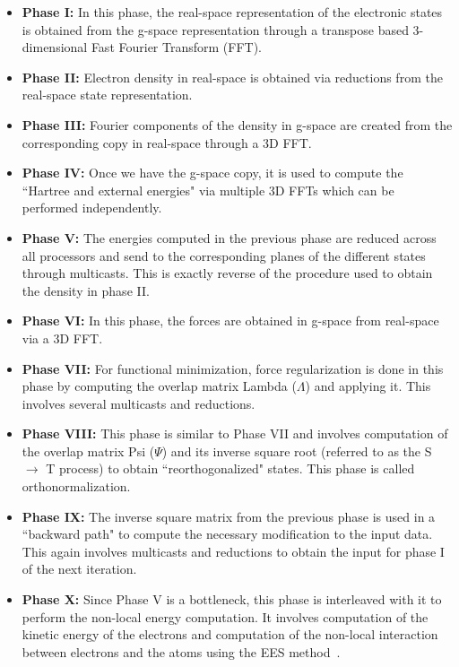 \documentclass[12pt,letter]{article}
\begin{document}
\begin{itemize}
\item{\bf Phase I:} In this phase, the real-space representation of the 
electronic states is obtained from the g-space representation through a 
transpose based 3-dimensional Fast Fourier Transform (FFT). 

\item{\bf Phase II:} Electron density in real-space is obtained via reductions
from the real-space state representation.

\item{\bf Phase III:} Fourier components of the density in g-space are created
from the corresponding copy in real-space through a 3D FFT.

\item{\bf Phase IV:} Once we have the g-space copy, it is used to compute the
``Hartree and external energies" via multiple 3D FFTs which can be performed
independently.

\item{\bf Phase V:} The energies computed in the previous phase are reduced
across all processors and send to the corresponding planes of the different 
states through multicasts. This is exactly reverse of the procedure used to 
obtain the density in phase II.

\item{\bf Phase VI:} In this phase, the forces are obtained in g-space from
real-space via a 3D FFT.

\item{\bf Phase VII:} For functional minimization, force regularization is done
in this phase by computing the overlap matrix Lambda ($\Lambda$) and applying 
it. This involves several multicasts and reductions.

\item{\bf Phase VIII:} This phase is similar to Phase VII and involves
computation of the overlap matrix Psi ($\Psi$) and its inverse square root 
(referred to as the S $\rightarrow$ T process) to obtain ``reorthogonalized" 
states. This phase is called orthonormalization.

\item{\bf Phase IX:} The inverse square matrix from the previous phase is
used in a ``backward path" to compute the necessary modification to the
input data. This again involves multicasts and reductions to obtain the input
for phase I of the next iteration.

\item{\bf Phase X:} Since Phase V is a bottleneck, this phase is interleaved 
with it to perform the non-local energy computation. It involves computation of
the kinetic energy of the electrons and computation of the non-local 
interaction between electrons and the atoms using the EES method~\cite{EESNL}.
\end{itemize}
\end{document}
